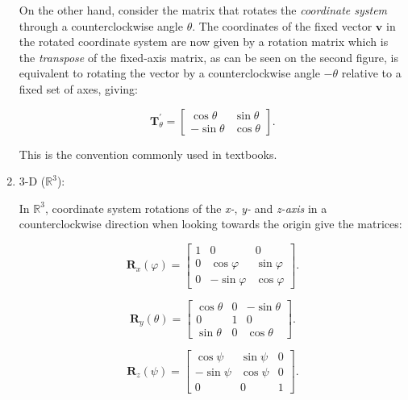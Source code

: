 \documentclass[10pt,b5paper,titlepage]{book}
\begin{document}
\begin{enumerate}
        On the other hand, consider the matrix that rotates the
        \textit{coordinate system} through a counterclockwise angle $\theta$.
        The coordinates of the fixed vector $\mathbf{v}$ in the rotated
        coordinate system are now given by a rotation matrix which is the
        \textit{transpose} of the fixed-axis matrix, as can be seen on the
        second figure, is equivalent to rotating the vector by
        a counterclockwise angle $-\theta$ relative to a fixed set of axes,
        giving:

        \begin{equation}
            \mathbf{T}_{\theta}^{'} = \begin{bmatrix}
                \cos \theta & \sin \theta \\
                -\sin \theta & \cos \theta
            \end{bmatrix}
        .\end{equation}

        This is the convention commonly used in textbooks.

    \item 3-D ($\mathbb{R}^{3}$):

        In $\mathbb{R}^{3}$, coordinate system rotations of the
        \textit{x-}, \textit{y-} and \textit{z-axis} in a counterclockwise
        direction when looking towards the origin give the matrices:

        \begin{equation}
            \mathbf{R}_{x}(\varphi) =
            \begin{bmatrix}
                1 & 0 & 0 \\
                0 & \cos \varphi & \sin \varphi \\
                0 & -\sin \varphi & \cos \varphi
            \end{bmatrix}
        .\end{equation}

        \begin{equation}
            \mathbf{R}_{y}(\theta) =
            \begin{bmatrix}
                \cos \theta & 0 & -\sin \theta \\
                0 & 1 & 0 \\
                \sin \theta & 0 & \cos \theta
            \end{bmatrix}
        .\end{equation}

        \begin{equation}
            \mathbf{R}_{z}(\psi) =
            \begin{bmatrix}
                \cos \psi & \sin \psi & 0 \\
                -\sin \psi & \cos \psi & 0 \\
                0 & 0 & 1
            \end{bmatrix}
        .\end{equation}


\end{enumerate}
\end{document}
